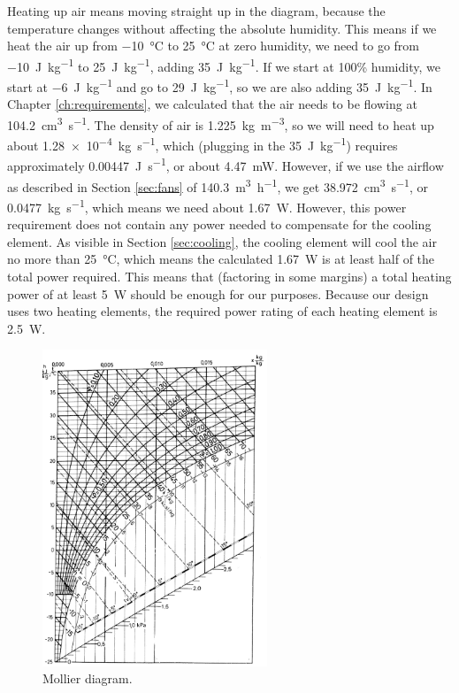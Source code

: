 \documentclass[a4paper,oneside]{book}
\begin{document}
Heating up air means moving straight up in the diagram, because the temperature
changes without affecting the absolute humidity. This means if we heat the air
up from \SI{-10}{\celsius} to \SI{25}{\celsius} at zero humidity, we need to go
from \SI{-10}{\J\per\kg} to \SI{25}{\J\per\kg}, adding \SI{35}{\J\per\kg}. If
we start at 100\% humidity, we start at \SI{-6}{\J\per\kg} and go to
\SI{29}{\J\per\kg}, so we are also adding \SI{35}{\J\per\kg}. In Chapter
\ref{ch:requirements}, we calculated that the air needs to be flowing at
\SI{104.2}{\cm\cubed\per\s}. The density of air is \SI{1.225}{\kg\per\m\cubed},
so we will need to heat up about \SI{1.28e-4}{\kg\per\s}, which (plugging in
the \SI{35}{\J\per\kg}) requires approximately \SI{0.00447}{\J\per\s}, or about
\SI{4.47}{\milli\W}. However, if we use the airflow as described in Section
\ref{sec:fans} of \SI{140.3}{\m\cubed\per\hour}, we get
\SI{38,972}{\cm\cubed\per\s}, or \SI{0.0477}{\kg\per\s}, which means we need
about \SI{1.67}{\W}. However, this power requirement does not contain any power
needed to compensate for the cooling element. As visible in Section
\ref{sec:cooling}, the cooling element will cool the air no more than
\SI{25}{\celsius}, which means the calculated \SI{1.67}{\W} is at least half of
the total power required. This means that (factoring in some margins) a total
heating power of at least \SI{5}{\W} should be enough for our purposes. Because
our design uses two heating elements, the required power rating of each heating
element is \SI{2.5}{\W}.

\begin{figure}[!htb]
\centering
\includegraphics[width=0.6\textwidth]{images/mollier.png}
\caption{Mollier diagram. \protect\cite{mollier}}
\label{fig:mollier}
\end{figure}
\end{document}

